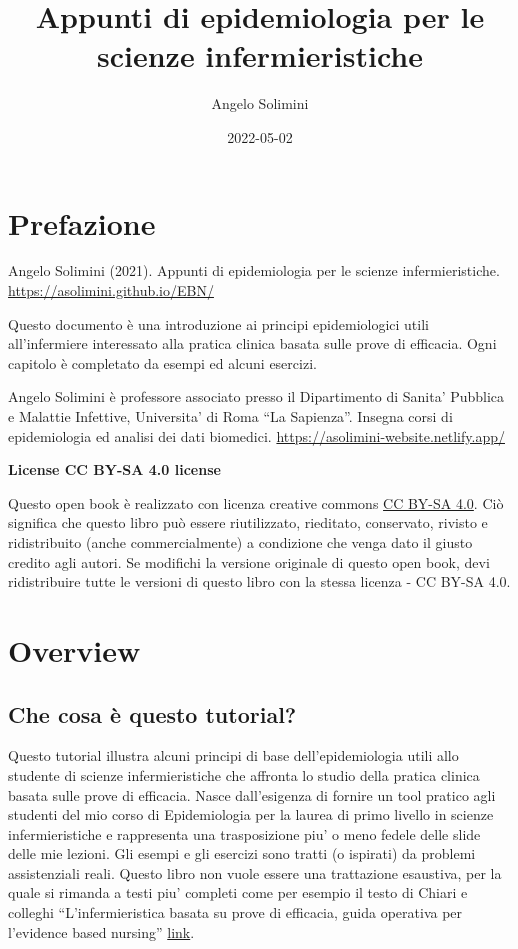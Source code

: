 \documentclass[]{book}
\title{Appunti di epidemiologia per le scienze infermieristiche}
\author{Angelo Solimini}
\date{2022-05-02}
\begin{document}
\maketitle

{
\setcounter{tocdepth}{1}
\tableofcontents
}
\hypertarget{prefazione}{%
\chapter*{Prefazione}\label{prefazione}}

Angelo Solimini (2021). Appunti di epidemiologia per le scienze infermieristiche. \url{https://asolimini.github.io/EBN/}

Questo documento è una introduzione ai principi epidemiologici utili all'infermiere interessato alla pratica clinica basata sulle prove di efficacia. Ogni capitolo è completato da esempi ed alcuni esercizi.

Angelo Solimini è professore associato presso il Dipartimento di Sanita' Pubblica e Malattie Infettive, Universita' di Roma ``La Sapienza''. Insegna corsi di epidemiologia ed analisi dei dati biomedici. \url{https://asolimini-website.netlify.app/}

\textbf{License CC BY-SA 4.0 license}

Questo open book è realizzato con licenza creative commons \href{https://creativecommons.org/licenses/by-sa/4.0/}{CC BY-SA 4.0}. Ciò significa che questo libro può essere riutilizzato, rieditato, conservato, rivisto e ridistribuito (anche commercialmente) a condizione che venga dato il giusto credito agli autori. Se modifichi la versione originale di questo open book, devi ridistribuire tutte le versioni di questo libro con la stessa licenza - CC BY-SA 4.0.

\hypertarget{overview}{%
\chapter{Overview}\label{overview}}

\hypertarget{che-cosa-uxe8-questo-tutorial}{%
\section{Che cosa è questo tutorial?}\label{che-cosa-uxe8-questo-tutorial}}

Questo tutorial illustra alcuni principi di base dell'epidemiologia utili allo studente di scienze infermieristiche che affronta lo studio della pratica clinica basata sulle prove di efficacia. Nasce dall'esigenza di fornire un tool pratico agli studenti del mio corso di Epidemiologia per la laurea di primo livello in scienze infermieristiche e rappresenta una trasposizione piu' o meno fedele delle slide delle mie lezioni. Gli esempi e gli esercizi sono tratti (o ispirati) da problemi assistenziali reali. Questo libro non vuole essere una trattazione esaustiva, per la quale si rimanda a testi piu' completi come per esempio il testo di Chiari e colleghi ``L'infermieristica basata su prove di efficacia, guida operativa per l'evidence based nursing'' \href{https://www.mheducation.it/evidence-based-clinical-practice-2-ed-9788838636738-italy}{link}.
\end{document}
